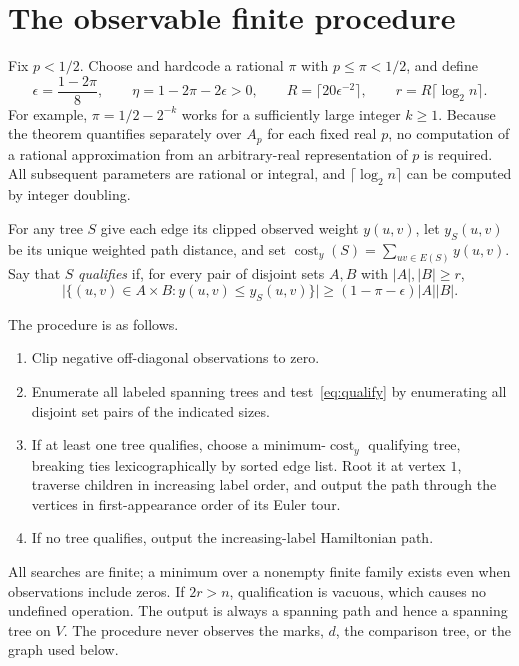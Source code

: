 \documentclass[acmlarge,screen,nonacm,11pt]{acmart}
\newcommand{\cost}{\operatorname{cost}}
\begin{document}
\section{The observable finite procedure}\label{sec:algorithm}
Fix $p<1/2$. Choose and hardcode a rational $\pi$ with $p\leq\pi<1/2$, and define
\begin{equation}\label{eq:parameters}
 \epsilon=\frac{1-2\pi}{8},\qquad
 \eta=1-2\pi-2\epsilon>0,\qquad
 R=\lceil20\epsilon^{-2}\rceil,\qquad
 r=R\lceil\log_2 n\rceil.
\end{equation}
For example, $\pi=1/2-2^{-k}$ works for a sufficiently large integer $k\geq1$. Because the theorem quantifies separately over $A_p$ for each fixed real $p$, no computation of a rational approximation from an arbitrary-real representation of $p$ is required. All subsequent parameters are rational or integral, and $\lceil\log_2 n\rceil$ can be computed by integer doubling.

For any tree $S$ give each edge its clipped observed weight $y(u,v)$, let $y_S(u,v)$ be its unique weighted path distance, and set $\cost_y(S)=\sum_{uv\in E(S)}y(u,v)$. Say that $S$ \emph{qualifies} if, for every pair of disjoint sets $A,B$ with $|A|,|B|\geq r$,
\begin{equation}\label{eq:qualify}
 \bigl|\{(u,v)\in A\times B:y(u,v)\leq y_S(u,v)\}\bigr|
 \geq(1-\pi-\epsilon)|A||B|.
\end{equation}

The procedure is as follows.
\begin{enumerate}
\item Clip negative off-diagonal observations to zero.
\item Enumerate all labeled spanning trees and test~\eqref{eq:qualify} by enumerating all disjoint set pairs of the indicated sizes.
\item If at least one tree qualifies, choose a minimum-$\cost_y$ qualifying tree, breaking ties lexicographically by sorted edge list. Root it at vertex $1$, traverse children in increasing label order, and output the path through the vertices in first-appearance order of its Euler tour.
\item If no tree qualifies, output the increasing-label Hamiltonian path.
\end{enumerate}
All searches are finite; a minimum over a nonempty finite family exists even when observations include zeros. If $2r>n$, qualification is vacuous, which causes no undefined operation. The output is always a spanning path and hence a spanning tree on $V$. The procedure never observes the marks, $d$, the comparison tree, or the graph used below.
\end{document}
